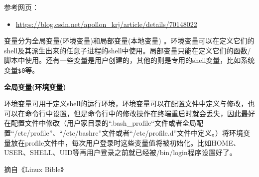 \documentclass[doctor,openright,twoside]{sjtuthesis}
\providecommand{\tightlist}{%
    \setlength{\itemsep}{0pt}\setlength{\parskip}{0pt}}
\newcommand{\passthrough}[1]{#1}
\theoremstyle{plain}
\theoremstyle{definition}
\theoremstyle{remark}
\theoremstyle{ocrenumbox}
\theoremstyle{plain}
\begin{document}
参考网页：

\begin{itemize}
\tightlist
\item
  \url{https://blog.csdn.net/apollon_krj/article/details/70148022}
\end{itemize}

变量分为全局变量(环境变量)和局部变量(本地变量) 。环境变量可以在定义它们的shell及其派生出来的任意子进程的shell中使用。局部变量只能在定义它们的函数/脚本中使用。还有一些变量是用户创建的，其他的则是专用的shell变量，比如系统变量\passthrough{\lstinline!$0!}等。

\textbf{全局变量(环境变量)}

环境变量可用于定义shell的运行环境，环境变量可以在配置文件中定义与修改，也可以在命令行中设置，但是命令行中的修改操作在终端重启时就会丢失，因此最好在配置文件中修改（用户家目录的``.bash\_profile``文件或者全局配置``/etc/profile''、``/etc/bashrc''文件或者``/etc/profile.d''文件中定义。）将环境变量放在profile文件中，每次用户登录时这些变量值将被初始化。比如HOME、USER、SHELL、UID等再用户登录之前就已经被/bin/login程序设置好了。

摘自《Linux Bible》
\end{document}
